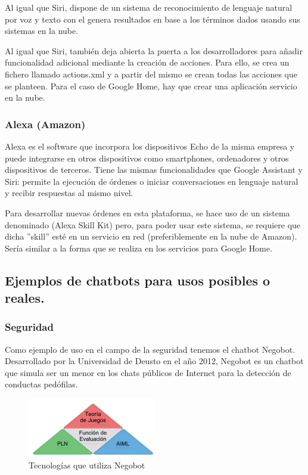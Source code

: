\documentclass[spanish,12pt, a4paper, twoside]{paper}
\begin{document}
Al igual que Siri, dispone de un sistema de reconocimiento de lenguaje natural por voz y texto con el genera resultados en base a los términos dados usando sus sistemas en la nube.
\newline

Al igual que Siri, también deja abierta la puerta a los desarrolladores para añadir funcionalidad adicional mediante la creación de acciones. Para ello, se crea un fichero llamado actions.xml y a partir del mismo se crean todas las acciones que se planteen. Para el caso de Google Home, hay que crear una aplicación servicio en la nube.

\subsubsection{Alexa (Amazon)}

Alexa es el software que incorpora los dispositivos Echo de la misma empresa y puede integrarse en otros dispositivos como smartphones, ordenadores y otros dispositivos de terceros. Tiene las mismas funcionalidades que Google Assistant y Siri: permite la ejecución de órdenes o iniciar conversaciones en lenguaje natural y recibir respuestas al mismo nivel.
\newline

Para desarrollar nuevas órdenes en esta plataforma, se hace uso de un sistema denominado (Alexa Skill Kit) pero, para poder usar este sistema, se requiere que dicha ''skill'' esté en un servicio en red (preferiblemente en la nube de Amazon). Sería similar a la forma que se realiza en los servicios para Google Home.

\subsection{Ejemplos de chatbots para usos posibles o reales.}

\subsubsection{Seguridad}

Como ejemplo de uso en el campo de la seguridad tenemos el chatbot Negobot. Desarrollado por la Universidad de Deusto en el año 2012, Negobot es un chatbot que simula ser un menor en los chats públicos de Internet para la detección de conductas pedófilas.
\newline

\begin{figure}
\centering
	\includegraphics[width=0.5\textwidth]{recursos/Negobot_tecnologia}
\caption{Tecnologías que utiliza Negobot}
\label{fig:Tecnologías de Negobot}
\end{figure}
\end{document}
